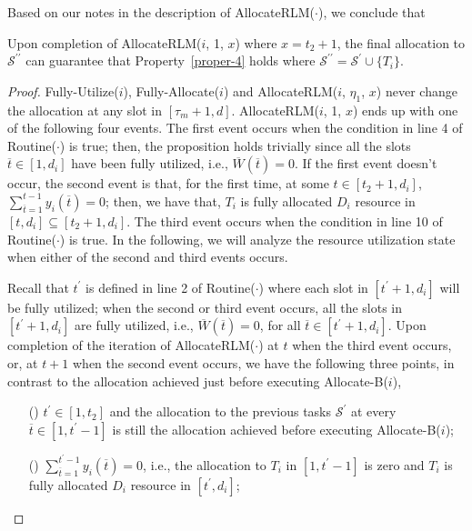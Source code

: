 \documentclass[10pt,journal,compsoc]{IEEEtran}
\newcommand{\rmnum}[1]{\romannumeral #1}
\begin{document}
Based on our notes in the description of AllocateRLM($\cdot$), we conclude that
\begin{proposition}\label{theo-structure}
Upon completion of AllocateRLM($i$, 1, $x$) where $x=t_{2}+1$, the final allocation to $\mathcal{S}^{\prime\prime}$ can guarantee that Property~\ref{proper-4} holds where $\mathcal{S}^{\prime\prime} = \mathcal{S}^{\prime} \cup \{T_{i}\}$.
\end{proposition}
\begin{proof}
Fully-Utilize($i$), Fully-Allocate($i$) and AllocateRLM($i$, $\eta_{1}$, $x$) never change the allocation at any slot in $[\tau_{m}+1, d]$. AllocateRLM($i$, 1, $x$) ends up with one of the following four events. The first event occurs when the condition in line 4 of Routine($\cdot$) is true; then, the proposition holds trivially since all the slots $\overline{t}\in [1, d_{i}]$ have been fully utilized, i.e., $\overline{W}(\overline{t})=0$. If the first event doesn't occur, the second event is that, for the first time, at some $t\in[t_{2}+1, d_{i}]$, $\sum_{\overline{t}=1}^{t-1}{y_{i}(\overline{t})}=0$; then, we have that, $T_{i}$ is fully allocated $D_{i}$ resource in $[t, d_{i}]\subseteq [t_{2}+1, d_{i}]$. The third event occurs when the condition in line 10 of Routine($\cdot$) is true. In the following, we will analyze the resource utilization state when either of the second and third events occurs.

Recall that $t^{\prime}$ is defined in line 2 of Routine($\cdot$) where each slot in $[t^{\prime}+1, d_{i}]$ will be fully utilized; when the second or third event occurs, all the slots in $[t^{\prime}+1, d_{i}]$ are fully utilized, i.e., $\overline{W}(\overline{t})=0$, for all $\overline{t}\in [t^{\prime}+1, d_{i}]$. Upon completion of the iteration of AllocateRLM($\cdot$) at $t$ when the third event occurs, or, at $t+1$ when the second event occurs, we have the following three points, in contrast to the allocation achieved just before executing Allocate-B($i$),
\begin{enumerate}
 \setlength\itemsep{0.1em}
\item [(\rmnum{1})] $t^{\prime}\in [1, t_{2}]$ and the allocation to the previous tasks $\mathcal{S}^{\prime}$ at every $\overline{t}\in [1, t^{\prime}-1]$ is still the allocation achieved before executing Allocate-B($i$);

\item [(\rmnum{2})] $\sum_{\overline{t}=1}^{t^{\prime}-1}{y_{i}(\overline{t})}=0$, i.e., the allocation to $T_{i}$ in $[1, t^{\prime}-1]$ is zero and $T_{i}$ is fully allocated $D_{i}$ resource in $[t^{\prime}, d_{i}]$;


\end{enumerate}
\end{proof}
\end{document}
